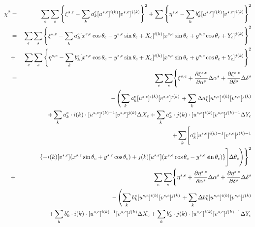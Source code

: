 \documentclass[12pt]{article}
\begin{document}
\begin{eqnarray}
\chi^2 & = & \sum_e \sum_s \left\{ \xi^{s,e}-\sum_k a_k^e [u^{s,e}]^{i(k)} [v^{s,e}]^{j(k)} \right\}^2 + \sum \left\{ \eta^{s,e}-\sum_k b_k^e [u^{s,e}]^{i(k)} [v^{s,e}]^{j(k)} \right\}^2 \\
& = & \sum_e \sum_s \left\{ \xi^{s,e}-\sum_k a_k^e [x^{s,e}\cos\theta_c-y^{s,c}\sin\theta_c+X_c]^{i(k)} [x^{s,e}\sin\theta_c+y^{s,c}\cos\theta_c+Y_c]^{j(k)} \right\}^2 \nonumber \\
& + & \sum_e \sum_s \left\{ \eta^{s,e}-\sum_k b_k^e [x^{s,e}\cos\theta_c-y^{s,c}\sin\theta_c+X_c]^{i(k)} [x^{s,e}\sin\theta_c+y^{s,c}\cos\theta_c+Y_c]^{j(k)} \right\}^2 \\
& = & \sum_e \sum_s \Biggl\{ \xi^{s,e} + \frac{\partial \xi^{s,e}}{\partial \alpha^{s}} \Delta\alpha^{s} + \frac{\partial \xi^{s,e}}{\partial \delta^{s}} \Delta\delta^{s}  \nonumber \\
&  & \hspace{0.7cm}- \left(\sum_k a_k^e [u^{s,e}]^{i(k)} [v^{s,e}]^{j(k)} \right. +\sum_k \Delta a_k^e [u^{s,e}]^{i(k)} [v^{s,e}]^{j(k)} \nonumber \\
&  & \hspace{1.0cm}+ \sum_k a_k^e \cdot i(k) \cdot [u^{s,e}]^{i(k)-1} [v^{s,e}]^{j(k)} \Delta X_c + \sum_k a_k^e \cdot j(k) \cdot [u^{s,e}]^{i(k)} [v^{s,e}]^{j(k)-1} \Delta Y_c \nonumber \\
&  & \hspace{1.0cm}+ \sum_k \Biggr[ a_k^e [u^{s,e}]^{i(k)-1} [v^{s,e}]^{j(k)-1}  \nonumber \\
& & \hspace{1.0cm} \{-i(k)[v^{s,e}](x^{s,e}\sin\theta_c+y^{s,e}\cos\theta_c)+j(k)[u^{s,e}](x^{s,e}\cos\theta_c-y^{s,e}\sin\theta_c) \} \Biggr] \Delta \theta_c \Biggr) \Biggr\}^2 \nonumber \\
& + & \sum_e \sum_s \Biggl\{ \eta^{s,e} + \frac{\partial \eta^{s,e}}{\partial \alpha^{s}} \Delta\alpha^{s} + \frac{\partial \eta^{s,e}}{\partial \delta^{s}} \Delta\delta^{s}  \nonumber \\
&  & \hspace{0.7cm}- \left(\sum_k b_k^e [u^{s,e}]^{i(k)} [v^{s,e}]^{j(k)} \right. +\sum_k \Delta b_k^e [u^{s,e}]^{i(k)} [v^{s,e}]^{j(k)} \nonumber \\
&  & \hspace{1.0cm}+ \sum_k b_k^e \cdot i(k) \cdot [u^{s,e}]^{i(k)-1} [v^{s,e}]^{j(k)} \Delta X_c + \sum_k b_k^e \cdot j(k) \cdot [u^{s,e}]^{i(k)} [v^{s,e}]^{j(k)-1} \Delta Y_c \nonumber \\

\end{eqnarray}
\end{document}
